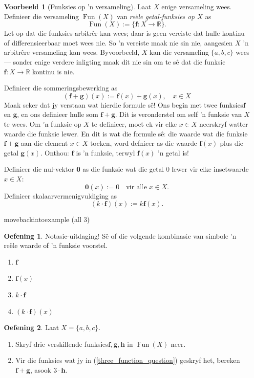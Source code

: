 \documentclass[a4paper,11pt]{book}
\theoremstyle{definition}
\newtheorem{exercise}{Oefening}
\newtheorem{example_environment}{Voorbeeld}[chapter]
\newcommand{\be}{\begin{equation}}
\newcommand{\ee}{\end{equation}}
\newcommand{\ve}[1]{\mathbf{#1}}
\newenvironment{example}
	{
		\begin{oframed}
		\begin{example_environment}
	}
	{
		\end{example_environment}
		\end{oframed}
	}
\DeclareMathOperator{\Fun}{Fun}
\begin{document}
\begin{example}[Funksies op 'n versameling] Laat $X$ enige versameling
	wees. Definieer die versameling $\Fun(X)$ van \emph{ re{\"e}le
	getal-funksies op $X$} as
	\be
	\Fun(X) := \{ \mathbf{f} : X \rightarrow \mathbb{R} \}.
	\ee
	Let op dat die funksies arbitr{\^e}r kan wees; daar is geen vereiste
	dat hulle kontinu of differensieerbaar moet wees nie. So 'n vereiste
	maak nie sin nie, aangesien $X$ 'n arbitr{\^e}re versameling kan wees.
	Byvoorbeeld, $X$ kan die versameling $\{a, b, c\}$ wees --- sonder
	enige verdere inligting maak dit nie sin om te s{\^e} dat die funksie
	$\mathbf{f} : X \rightarrow \mathbb{R}$ kontinu is nie.

	Definieer die sommeringsbewerking as
	\be
	(\mathbf{f} + \mathbf{g}) (x) := \mathbf{f}(x) + \mathbf{g}(x), \quad x
	\in X
	\ee
	Maak seker dat jy verstaan wat hierdie formule s{\^e}! Ons begin met
	twee funksies$\mathbf{f}$ en $\mathbf{g}$, en ons definieer hulle som
	$\mathbf{f} + \mathbf{g}$. Dit is veronderstel om self 'n funksie van
	$X$ te wees. Om 'n funksie op $X$ te definieer, moet ek vir elke $x \in
	X$ neerskryf watter waarde die funksie lewer. En dit is wat die formule
	s{\^e}: die waarde wat die funksie $\mathbf{f} + \mathbf{g}$ aan die
	element $x \in X$ toeken, word defnieer as die waarde $\mathbf{f}(x)$
	plus die getal $\mathbf{g}(x)$. Onthou: $\mathbf{f}$ is 'n funksie,
	terwyl $\mathbf{f}(x)$ 'n getal is!

	Definieer die nul-vektor $\mathbf{0}$ as die funksie wat die getal $0$
	lewer vir elke insetwaarde $x \in X$:
	\be
	\ve{0} (x) := 0 \quad \mbox{vir alle $x \in X$.}
	\ee
	Definieer skalaarvermenigvuldiging as
	\be
	(k \cdot \mathbf{f})(x) := k \mathbf{f}(x).
	\ee

\end{example}movebackintoexample (all 3)
	\begin{exercise} Notasie-uitdaging! S{\^e} of die volgende kombinasie
	van
	simbole 'n re{\"e}le waarde of 'n funksie voorstel.
	\begin{enumerate}
		\item $\mathbf{f}$
		\item $\mathbf{f}(x)$
		\item $k \cdot \mathbf{f}$
		\item $(k \cdot \mathbf{f})(x)$
	\end{enumerate}
\end{exercise}

\begin{exercise} Laat $X = \{a, b, c\}$.
	\begin{enumerate}
		\item \label{three_function_question}Skryf drie verskillende
		funksies$\mathbf{f}, \mathbf{g},
		\mathbf{h}$ in $\Fun(X)$ neer.
		\item Vir die funksies wat jy in
		(\ref{three_function_question}) geskryf het, bereken
		$\mathbf{f} + \mathbf{g}$, asook $3 \cdot \mathbf{h}$.
	\end{enumerate}
\end{exercise}
\end{document}
